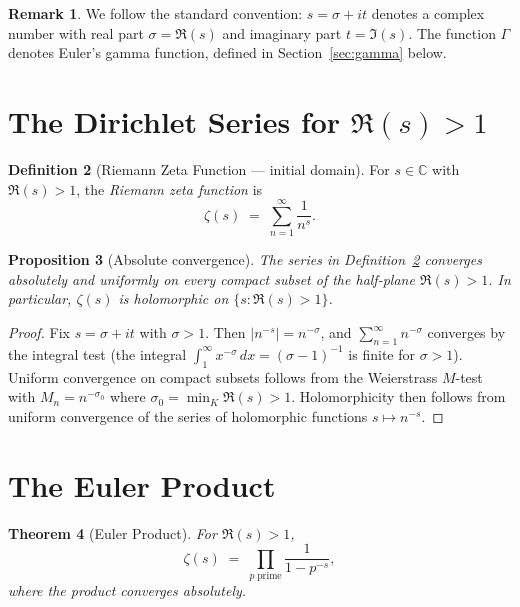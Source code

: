 \documentclass[12pt,a4paper]{amsart}
\newtheorem{theorem}{Theorem}[section]
\newtheorem{proposition}[theorem]{Proposition}
\theoremstyle{definition}
\newtheorem{definition}[theorem]{Definition}
\newtheorem{remark}[theorem]{Remark}
\newcommand{\C}{\mathbb{C}}
\begin{document}
\begin{remark}
We follow the standard convention: $s = \sigma + it$ denotes a complex
number with real part $\sigma = \Re(s)$ and imaginary part $t = \Im(s)$.
The function $\Gamma$ denotes Euler's gamma function, defined in
Section~\ref{sec:gamma} below.
\end{remark}

\section{The Dirichlet Series for \texorpdfstring{$\Re(s)>1$}{Re(s)>1}}

\begin{definition}[Riemann Zeta Function --- initial domain]
\label{def:zeta_series}
For $s \in \C$ with $\Re(s) > 1$, the \emph{Riemann zeta function} is
\[
  \zeta(s) \;=\; \sum_{n=1}^{\infty} \frac{1}{n^s}.
\]
\end{definition}

\begin{proposition}[Absolute convergence]
\label{prop:convergence}
The series in Definition~\ref{def:zeta_series} converges absolutely and
uniformly on every compact subset of the half-plane $\Re(s) > 1$.
In particular, $\zeta(s)$ is holomorphic on $\{s : \Re(s) > 1\}$.
\end{proposition}

\begin{proof}
Fix $s = \sigma + it$ with $\sigma > 1$.  Then $|n^{-s}| = n^{-\sigma}$,
and $\sum_{n=1}^\infty n^{-\sigma}$ converges by the integral test
(the integral $\int_1^\infty x^{-\sigma}\,dx = (\sigma-1)^{-1}$ is finite
for $\sigma > 1$).  Uniform convergence on compact subsets follows from
the Weierstrass $M$-test with $M_n = n^{-\sigma_0}$ where
$\sigma_0 = \min_K \Re(s) > 1$.  Holomorphicity then follows from
uniform convergence of the series of holomorphic functions $s \mapsto n^{-s}$.
\end{proof}

\section{The Euler Product}

\begin{theorem}[Euler Product]
\label{thm:euler_product}
For $\Re(s) > 1$,
\[
  \zeta(s) \;=\; \prod_{p\;\text{prime}} \frac{1}{1 - p^{-s}},
\]
where the product converges absolutely.
\end{theorem}
\end{document}
